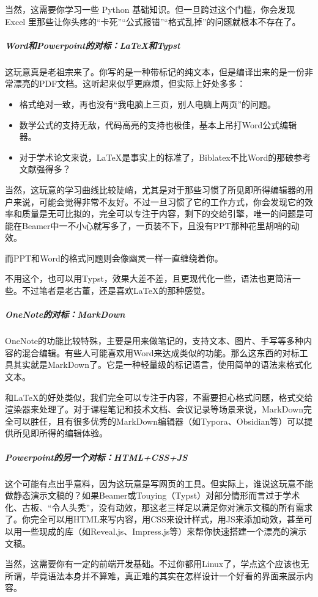 当然，这需要你学习一些 Python 基础知识。但一旦跨过这个门槛，你会发现 Excel 里那些让你头疼的“卡死”“公式报错”“格式乱掉”的问题就根本不存在了。

\subparagraph{Word和Powerpoint的对标：LaTeX和Typst} 这玩意真是老祖宗来了。你写的是一种带标记的纯文本，但是编译出来的是一份非常漂亮的PDF文档。这听起来似乎更麻烦，但实际上好处多多：
\begin{itemize}
  \item 格式绝对一致，再也没有“我电脑上三页，别人电脑上两页”的问题。
  \item 数学公式的支持无敌，代码高亮的支持也极佳，基本上吊打Word公式编辑器。
  \item 对于学术论文来说，LaTeX是事实上的标准了，Biblatex不比Word的那破参考文献强得多？
\end{itemize}
当然，这玩意的学习曲线比较陡峭，尤其是对于那些习惯了所见即所得编辑器的用户来说，可能会觉得非常不友好。不过一旦习惯了它的工作方式，你会发现它的效率和质量是无可比拟的，完全可以专注于内容，剩下的交给引擎，唯一的问题是可能在Beamer中一不小心就写多了，一页装不下，且没有PPT那种花里胡哨的动效。

而PPT和Word的格式问题则会像幽灵一样一直缠绕着你。

不用这个，也可以用Typst，效果大差不差，且更现代化一些，语法也更简洁一些。不过笔者是老古董，还是喜欢LaTeX的那种感觉。

\subparagraph{OneNote的对标：MarkDown} OneNote的功能比较特殊，主要是用来做笔记的，支持文本、图片、手写等多种内容的混合编辑。有些人可能喜欢用Word来达成类似的功能。那么这东西的对标工具其实就是MarkDown了。它是一种轻量级的标记语言，使用简单的语法来格式化文本。

和LaTeX的好处类似，我们完全可以专注于内容，不需要担心格式问题，格式交给渲染器来处理了。对于课程笔记和技术文档、会议记录等场景来说，MarkDown完全可以胜任，且有很多优秀的MarkDown编辑器（如Typora、Obsidian等）可以提供所见即所得的编辑体验。

\subparagraph{Powerpoint的另一个对标：HTML+CSS+JS} 这个可能有点出乎意料，因为这玩意是写网页的工具。但实际上，谁说这玩意不能做静态演示文稿的？如果Beamer或Touying（Typst）对部分情形而言过于学术化、古板、“令人头秃”，没有动效，那这老三样足以满足你对演示文稿的所有需求了。你完全可以用HTML来写内容，用CSS来设计样式，用JS来添加动效，甚至可以用一些现成的库（如Reveal.js、Impress.js等）来帮你快速搭建一个漂亮的演示文稿。

当然，这需要你有一定的前端开发基础。不过你都用Linux了，学点这个应该也无所谓，毕竟语法本身并不算难，真正难的其实在怎样设计一个好看的界面来展示内容。

